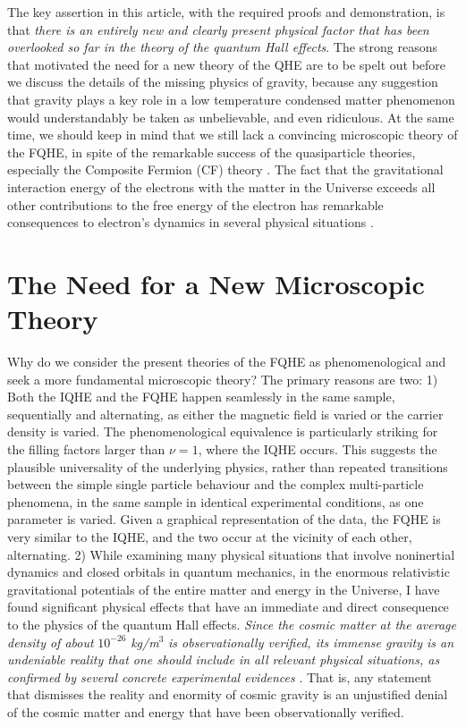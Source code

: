 \documentclass[aps,preprint,12pt,tightenlines]{revtex4}%
\begin{document}
The key assertion in this article, with the required proofs and demonstration,
is that \emph{there is an entirely new and clearly present physical factor
that has been overlooked so far in the theory of the quantum Hall effects}.
The strong reasons that motivated the need for a new theory of the QHE are to
be spelt out before we discuss the details of the missing physics of gravity,
because any suggestion that gravity plays a key role in a low temperature
condensed matter phenomenon would understandably be taken as unbelievable, and
even ridiculous.  At the same time, we should keep in mind that we still lack a
convincing microscopic theory of the FQHE, in spite of the remarkable success
of the quasiparticle theories, especially the Composite Fermion (CF) theory
\cite{Jain-book}. The fact that the gravitational interaction energy of the electrons with the matter in the Universe exceeds all other contributions to the free energy of the electron has remarkable consequences to electron's dynamics in several physical situations \cite{Unni-Cosrel}.

\section{The Need for a New Microscopic Theory}

Why do we consider the present theories of the FQHE as phenomenological and
seek a more fundamental microscopic theory? The primary reasons are two: 1)
Both the IQHE and the FQHE happen seamlessly in the same sample, sequentially
and alternating, as either the magnetic field is varied or the carrier density
is varied. The phenomenological equivalence is particularly striking for the filling factors larger than $\nu=1$, where the IQHE occurs. This suggests the plausible universality of the underlying physics,
rather than repeated transitions between the simple single particle behaviour
and the complex multi-particle phenomena, in the same sample in identical
experimental conditions, as one parameter is varied. Given a graphical
representation of the data, the FQHE is very similar to the IQHE, and the two
occur at the vicinity of each other, alternating. 2) While examining many
physical situations that involve noninertial dynamics and closed orbitals in
quantum mechanics, in the enormous relativistic gravitational potentials of
the entire matter and energy in the Universe, I have found significant
physical effects that have an immediate and direct consequence to the
physics of the quantum Hall effects. \emph{Since the cosmic matter at the
average density of about }$10^{-26}$\emph{ kg/m}$^{3}$\emph{ is
observationally verified, its immense gravity is an undeniable reality that
one should include in all relevant physical situations, as confirmed by
several concrete experimental evidences} \cite{Unni-Cosrel,Unni-ISI,Unni-TPU}. That is, any statement that dismisses the reality and enormity of cosmic gravity is an unjustified denial of the cosmic matter and energy that have been observationally verified.
\end{document}
